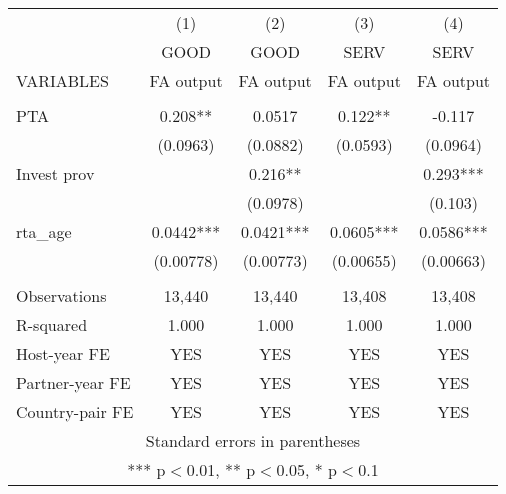 \begin{tabular}{lcccc} \hline
 & (1) & (2) & (3) & (4) \\
 & GOOD & GOOD & SERV & SERV \\
VARIABLES & FA output & FA output & FA output & FA output \\ \hline
 &  &  &  &  \\
PTA & 0.208** & 0.0517 & 0.122** & -0.117 \\
 & (0.0963) & (0.0882) & (0.0593) & (0.0964) \\
Invest prov &  & 0.216** &  & 0.293*** \\
 &  & (0.0978) &  & (0.103) \\
rta\_age & 0.0442*** & 0.0421*** & 0.0605*** & 0.0586*** \\
 & (0.00778) & (0.00773) & (0.00655) & (0.00663) \\
 &  &  &  &  \\
Observations & 13,440 & 13,440 & 13,408 & 13,408 \\
R-squared & 1.000 & 1.000 & 1.000 & 1.000 \\
Host-year FE & YES & YES & YES & YES \\
Partner-year FE & YES & YES & YES & YES \\
 Country-pair FE & YES & YES & YES & YES \\ \hline
\multicolumn{5}{c}{ Standard errors in parentheses} \\
\multicolumn{5}{c}{ *** p$<$0.01, ** p$<$0.05, * p$<$0.1} \\
\end{tabular}
